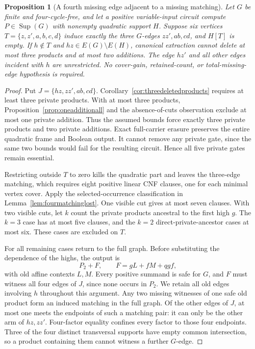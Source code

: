 \documentclass[11pt]{article}
\newcommand{\Sup}{\operatorname{Sup}}
\newtheorem{proposition}[theorem]{Proposition}
\theoremstyle{definition}
\theoremstyle{remark}
\begin{document}
\begin{proposition}[A fourth missing edge adjacent to a missing matching]\label{prop:adjacentfourth}
Let $G$ be finite and four-cycle-free, and let a positive variable-input circuit compute $P\in\Sup(G)$ with nonempty quadratic support $H$. Suppose six vertices $T=\{z,z',a,b,c,d\}$ induce exactly the three $G$-edges $zz',ab,cd$, and $H[T]$ is empty. If $h\notin T$ and $hz\in E(G)\setminus E(H)$, canonical extraction cannot delete at most three products and at most two additions. The edge $hz'$ and all other edges incident with $h$ are unrestricted. No cover-gain, retained-count, or total-missing-edge hypothesis is required.
\end{proposition}
\begin{proof}
Put $J=\{hz,zz',ab,cd\}$. Corollary~\ref{cor:threedeletedproducts} requires at least three private products. With at most three products, Proposition~\ref{prop:oneadditionall} and the absence-of-cuts observation exclude at most one private addition. Thus the assumed bounds force exactly three private products and two private additions. Exact full-carrier erasure preserves the entire quadratic frame and Boolean output. It cannot remove any private gate, since the same two bounds would fail for the resulting circuit. Hence all five private gates remain essential.

Restricting outside $T$ to zero kills the quadratic part and leaves the three-edge matching, which requires eight positive linear CNF clauses, one for each minimal vertex cover. Apply the selected-occurrence classification in Lemma~\ref{lem:fourmatchinglost}. One visible cut gives at most seven clauses. With two visible cuts, let $k$ count the private products ancestral to the first high $g$. The $k=3$ case has at most five clauses, and the $k=2$ direct-private-ancestor cases at most six. These cases are excluded on $T$.

For all remaining cases return to the full graph. Before substituting the dependence of the highs, the output is
\[
 P_2+F,\qquad F=gL+fM+qgf,
\]
with old affine contexts $L,M$. Every positive summand is safe for $G$, and $F$ must witness all four edges of $J$, since none occurs in $P_2$. We retain all old edges involving $h$ throughout this argument. Any two missing witnesses of one safe old product form an induced matching in the full graph. Of the other edges of $J$, at most one meets the endpoints of such a matching pair: it can only be the other arm of $hz,zz'$. Four-factor equality confines every factor to those four endpoints. Three of the four distinct transversal supports have empty common intersection, so a product containing them cannot witness a further $G$-edge.


\end{proof}
\end{document}
